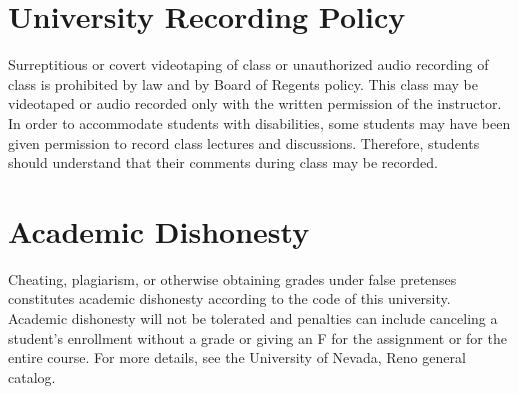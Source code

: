 \documentclass[11pt,onecolumn]{article}
\begin{document}
\section*{University Recording Policy}
Surreptitious or covert videotaping of class or unauthorized audio recording of class is prohibited by law and by Board of Regents policy. This class may be videotaped or audio recorded only with the written permission of the instructor. In order to accommodate students with disabilities, some students may have been given permission to record class lectures and discussions. Therefore, students should understand that their comments during class may be recorded.

\section*{Academic Dishonesty}
Cheating, plagiarism, or otherwise obtaining grades under false pretenses constitutes academic dishonesty according to the code of this university. Academic dishonesty will not be tolerated and penalties can include canceling a student’s enrollment without a grade or giving an F for the assignment or for the entire course. For more details, see the University of Nevada, Reno general catalog.


\end{document}
